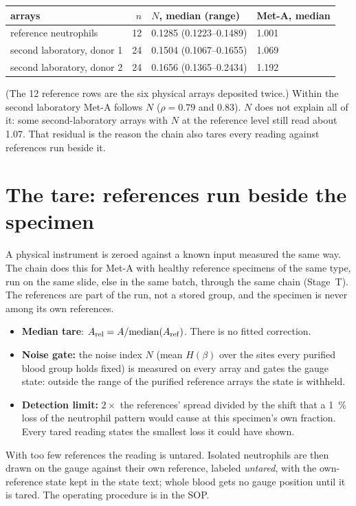 \begin{center}\small
\begin{tabular}{@{}lrll@{}}\toprule
arrays & $n$ & $N$, median (range) & Met-A, median \\\midrule
reference neutrophils & 12 & 0.1285 (0.1223--0.1489) & 1.001 \\
second laboratory, donor 1 & 24 & 0.1504 (0.1067--0.1655) & 1.069 \\
second laboratory, donor 2 & 24 & 0.1656 (0.1365--0.2434) & 1.192 \\\bottomrule
\end{tabular}
\end{center}
\measured{} (The 12 reference rows are the six physical arrays deposited twice.) Within the second laboratory
Met-A follows $N$ ($\rho=0.79$ and 0.83). $N$ does not explain all of it: some second-laboratory arrays with $N$ at the reference level still read
about 1.07. That residual is the reason the chain also tares every reading against references run beside it.

\section{The tare: references run beside the specimen}

A physical instrument is zeroed against a known input measured the same way. The chain does this for Met-A with healthy reference specimens of the same type, run on the same slide, else in the same batch, through the same chain (Stage~T). The
references are part of the run, not a stored group, and the specimen is never among its own references.
\begin{itemize}
\item \textbf{Median tare}: $A_{\rm rel}=A/\mathrm{median}(A_{\rm ref})$. There is no fitted correction.
\item \textbf{Noise gate:} the noise index $N$ (mean $H(\beta)$ over the sites every purified blood group holds fixed) is measured on
      every array and gates the gauge state: outside the range of the purified reference arrays the state is withheld.
\item \textbf{Detection limit:} $2\times$ the references' spread divided by the shift that a 1~\% loss of the neutrophil pattern would cause at this
      specimen's own fraction. Every tared reading states the smallest loss it could have shown.
\end{itemize}
With too few references the reading is untared. Isolated neutrophils are then drawn on the gauge against their own reference,
labeled \emph{untared}, with the own-reference state kept in the state text; whole blood gets no gauge position until it is tared.
The operating procedure is in the SOP.

